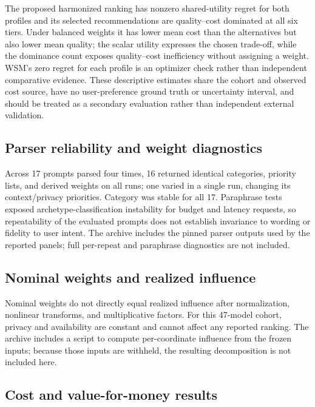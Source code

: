 \documentclass[pdflatex,sn-mathphys-num]{sn-jnl}
\theoremstyle{thmstyleone}
\theoremstyle{thmstylethree}
\begin{document}
The proposed harmonized ranking has nonzero shared-utility regret for both profiles and its selected recommendations are quality--cost dominated at all six tiers. Under balanced weights it has lower mean cost than the alternatives but also lower mean quality; the scalar utility expresses the chosen trade-off, while the dominance count exposes quality--cost inefficiency without assigning a weight. WSM's zero regret for each profile is an optimizer check rather than independent comparative evidence. These descriptive estimates share the cohort and observed cost source, have no user-preference ground truth or uncertainty interval, and should be treated as a secondary evaluation rather than independent external validation.

\subsection{Parser reliability and weight diagnostics}\label{subsec:parser_eval}

Across 17 prompts parsed four times, 16 returned identical categories, priority lists, and derived weights on all runs; one varied in a single run, changing its context/privacy priorities. Category was stable for all 17. Paraphrase tests exposed archetype-classification instability for budget and latency requests, so repeatability of the evaluated prompts does not establish invariance to wording or fidelity to user intent. The archive includes the pinned parser outputs used by the reported panels; full per-repeat and paraphrase diagnostics are not included.

\subsection{Nominal weights and realized influence}\label{subsec:weights}

Nominal weights do not directly equal realized influence after normalization, nonlinear transforms, and multiplicative factors. For this 47-model cohort, privacy and availability are constant and cannot affect any reported ranking. The archive includes a script to compute per-coordinate influence from the frozen inputs; because those inputs are withheld, the resulting decomposition is not included here.

\subsection{Cost and value-for-money results}\label{subsec:cost_priced}
\end{document}
